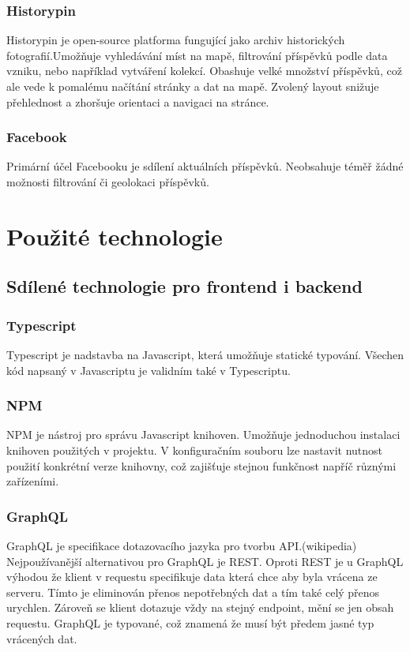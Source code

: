 \documentclass[12pt, a4paper,
 twoside,        %
 openright
]{report}
\begin{document}
\subsection{Historypin}
Historypin je open-source platforma fungující jako archiv historických fotografií.Umožňuje vyhledávání míst na mapě, filtrování příspěvků podle data vzniku, nebo například vytváření kolekcí. Obashuje velké množství příspěvků, což ale vede k pomalému načítání stránky a dat na mapě. Zvolený layout snižuje přehlednost a zhoršuje orientaci a navigaci na stránce.
\subsection{Facebook}
Primární účel Facebooku je sdílení aktuálních příspěvků. Neobsahuje téměř žádné možnosti filtrování či geolokaci příspěvků. 
\
\chapter{Použité technologie}
\section{Sdílené technologie pro frontend i backend}
\subsection{Typescript}
Typescript je nadstavba na Javascript, která umožňuje statické typování. Všechen kód napsaný v Javascriptu je validním také v Typescriptu. 
\subsection{NPM}
NPM je nástroj pro správu Javascript knihoven. Umožňuje jednoduchou instalaci knihoven použitých v projektu. V konfiguračním souboru lze nastavit nutnost použití konkrétní verze knihovny, což zajišťuje stejnou funkčnost napříč různými zařízeními. 
\subsection{GraphQL}
GraphQL je specifikace dotazovacího jazyka pro tvorbu API.(wikipedia) Nejpoužívanější alternativou pro GraphQL je REST. Oproti REST je u GraphQL výhodou že klient v requestu specifikuje data která chce aby byla vrácena ze serveru. Tímto je eliminován přenos nepotřebných dat a tím také celý přenos urychlen. Zároveň se klient dotazuje vždy na stejný endpoint, mění se jen obsah requestu. GraphQL je typované, což znamená že musí být předem jasné typ vrácených dat.
\end{document}
